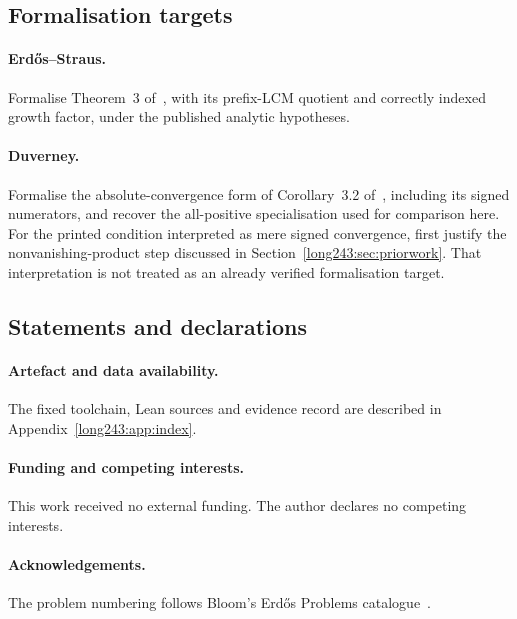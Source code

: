 \subsection*{Formalisation targets}

\paragraph{Erd\H{o}s--Straus.}
Formalise Theorem~3 of~\cite{erdosstraus1964}, with its prefix-LCM quotient
and correctly indexed growth factor, under the published analytic hypotheses.

\paragraph{Duverney.}
Formalise the absolute-convergence form of Corollary~3.2
of~\cite{duverney2001}, including its signed numerators, and recover the
all-positive specialisation used for comparison here. For the printed
condition interpreted as mere signed convergence, first justify the
nonvanishing-product step discussed in
Section~\ref{long243:sec:priorwork}. That interpretation is not treated
as an already verified formalisation target.

\subsection*{Statements and declarations}

\paragraph{Artefact and data availability.} The fixed toolchain,
Lean sources and evidence record are described in
Appendix~\ref{long243:app:index}.

\paragraph{Funding and competing interests.} This work received no external
funding.  The author declares no competing interests.

\paragraph{Acknowledgements.} The problem numbering follows
Bloom's Erd\H{o}s Problems catalogue~\cite{erdosproblems}.

\appendix

